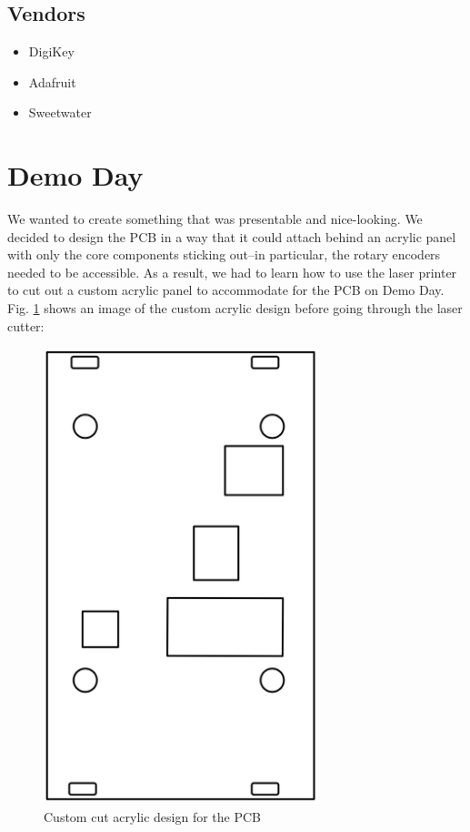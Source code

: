 \documentclass[letterpaper, 12 pt, conference]{ieeeconf}
\begin{document}
\subsection{Vendors}
\begin{itemize}
    \item DigiKey
    \item Adafruit
    \item Sweetwater
\end{itemize}


\section{Demo Day}

We wanted to create something that was presentable and nice-looking. We decided to design the PCB in a way that it could attach behind an acrylic panel with only the core components sticking out--in particular, the rotary encoders needed to be accessible. As a result, we had to learn how to use the laser printer to cut out a custom acrylic panel to accommodate for the PCB on Demo Day. Fig. \ref{acryl} shows an image of the custom acrylic design before going through the laser cutter:

    \begin{figure}[ht]
    \includegraphics[width=8cm]{images/pcb_acrylic.png}
    \centering
    \caption{Custom cut acrylic design for the PCB}
    \label{acryl}
    \end{figure} 
\end{document}
